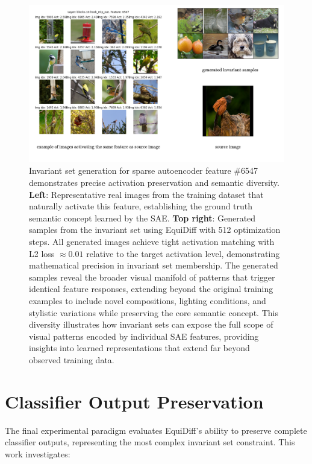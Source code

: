 \documentclass[licencjacka,en]{pracamgr}
\newcommand{\method}[1]{EquiDiff}  %
\begin{document}
\begin{figure}[h]
\centering
\includegraphics[width=\linewidth]{figures/main/experiment1.2.pdf}
\caption{Invariant set generation for sparse autoencoder feature \#6547 demonstrates precise activation preservation and semantic diversity. \textbf{Left}: Representative real images from the training dataset that naturally activate this feature, establishing the ground truth semantic concept learned by the SAE. \textbf{Top right}: Generated samples from the invariant set using \method{} with 512 optimization steps. All generated images achieve tight activation matching with L2 loss $\approx 0.01$ relative to the target activation level, demonstrating mathematical precision in invariant set membership. The generated samples reveal the broader visual manifold of patterns that trigger identical feature responses, extending beyond the original training examples to include novel compositions, lighting conditions, and stylistic variations while preserving the core semantic concept. This diversity illustrates how invariant sets can expose the full scope of visual patterns encoded by individual SAE features, providing insights into learned representations that extend far beyond observed training data.}
\label{fig:experiment_1_2}
\end{figure}

\section{Classifier Output Preservation}

The final experimental paradigm evaluates \method{}'s ability to preserve complete classifier outputs, representing the most complex invariant set constraint. This work investigates:
\end{document}
